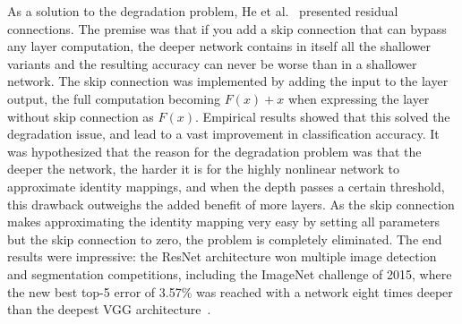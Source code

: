 \documentclass[english,twoside,openright]{UH_DS_MSc}
\begin{document}
As a solution to the degradation problem, He et al.~\cite{resnet} presented residual connections.
The premise was that if you add a skip connection that can bypass any layer computation, 
the deeper network contains in itself all the shallower variants and the resulting accuracy can never 
be worse than in a shallower network. The skip connection was implemented by adding the input to the layer output, the full computation becoming
$F(x) + x$ when expressing the layer without skip connection as $F(x)$.
Empirical results showed that this solved the degradation issue, and lead to a 
vast improvement in classification accuracy. It was hypothesized that the reason for the degradation problem 
was that the deeper the network, the harder it is for the highly nonlinear network to approximate identity mappings, and when 
the depth passes a certain threshold, this drawback outweighs the added benefit of more layers. As the skip 
connection makes approximating the identity mapping very easy by setting all parameters but the skip connection to zero, the problem is completely eliminated. The end results were impressive: 
the ResNet architecture won multiple image detection and segmentation competitions, including the ImageNet challenge 
of 2015, where the new best top-5 error of 3.57\% was reached with a network eight times deeper than the deepest VGG architecture~\cite{resnet}.
\end{document}
